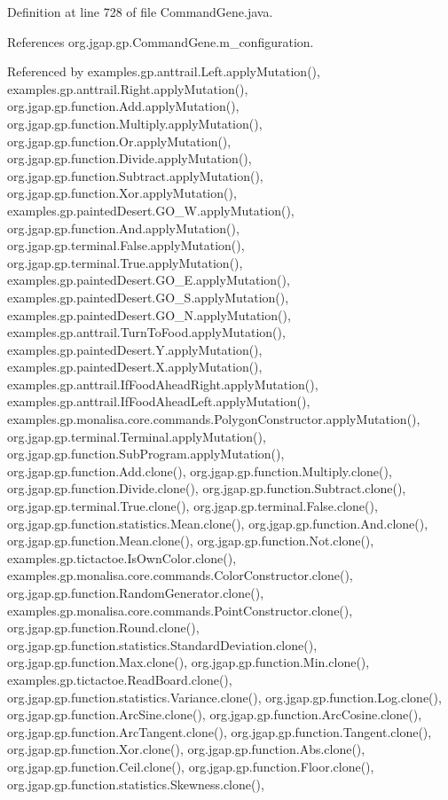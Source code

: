Definition at line 728 of file Command\-Gene.\-java.



References org.\-jgap.\-gp.\-Command\-Gene.\-m\-\_\-configuration.



Referenced by examples.\-gp.\-anttrail.\-Left.\-apply\-Mutation(), examples.\-gp.\-anttrail.\-Right.\-apply\-Mutation(), org.\-jgap.\-gp.\-function.\-Add.\-apply\-Mutation(), org.\-jgap.\-gp.\-function.\-Multiply.\-apply\-Mutation(), org.\-jgap.\-gp.\-function.\-Or.\-apply\-Mutation(), org.\-jgap.\-gp.\-function.\-Divide.\-apply\-Mutation(), org.\-jgap.\-gp.\-function.\-Subtract.\-apply\-Mutation(), org.\-jgap.\-gp.\-function.\-Xor.\-apply\-Mutation(), examples.\-gp.\-painted\-Desert.\-G\-O\-\_\-\-W.\-apply\-Mutation(), org.\-jgap.\-gp.\-function.\-And.\-apply\-Mutation(), org.\-jgap.\-gp.\-terminal.\-False.\-apply\-Mutation(), org.\-jgap.\-gp.\-terminal.\-True.\-apply\-Mutation(), examples.\-gp.\-painted\-Desert.\-G\-O\-\_\-\-E.\-apply\-Mutation(), examples.\-gp.\-painted\-Desert.\-G\-O\-\_\-\-S.\-apply\-Mutation(), examples.\-gp.\-painted\-Desert.\-G\-O\-\_\-\-N.\-apply\-Mutation(), examples.\-gp.\-anttrail.\-Turn\-To\-Food.\-apply\-Mutation(), examples.\-gp.\-painted\-Desert.\-Y.\-apply\-Mutation(), examples.\-gp.\-painted\-Desert.\-X.\-apply\-Mutation(), examples.\-gp.\-anttrail.\-If\-Food\-Ahead\-Right.\-apply\-Mutation(), examples.\-gp.\-anttrail.\-If\-Food\-Ahead\-Left.\-apply\-Mutation(), examples.\-gp.\-monalisa.\-core.\-commands.\-Polygon\-Constructor.\-apply\-Mutation(), org.\-jgap.\-gp.\-terminal.\-Terminal.\-apply\-Mutation(), org.\-jgap.\-gp.\-function.\-Sub\-Program.\-apply\-Mutation(), org.\-jgap.\-gp.\-function.\-Add.\-clone(), org.\-jgap.\-gp.\-function.\-Multiply.\-clone(), org.\-jgap.\-gp.\-function.\-Divide.\-clone(), org.\-jgap.\-gp.\-function.\-Subtract.\-clone(), org.\-jgap.\-gp.\-terminal.\-True.\-clone(), org.\-jgap.\-gp.\-terminal.\-False.\-clone(), org.\-jgap.\-gp.\-function.\-statistics.\-Mean.\-clone(), org.\-jgap.\-gp.\-function.\-And.\-clone(), org.\-jgap.\-gp.\-function.\-Mean.\-clone(), org.\-jgap.\-gp.\-function.\-Not.\-clone(), examples.\-gp.\-tictactoe.\-Is\-Own\-Color.\-clone(), examples.\-gp.\-monalisa.\-core.\-commands.\-Color\-Constructor.\-clone(), org.\-jgap.\-gp.\-function.\-Random\-Generator.\-clone(), examples.\-gp.\-monalisa.\-core.\-commands.\-Point\-Constructor.\-clone(), org.\-jgap.\-gp.\-function.\-Round.\-clone(), org.\-jgap.\-gp.\-function.\-statistics.\-Standard\-Deviation.\-clone(), org.\-jgap.\-gp.\-function.\-Max.\-clone(), org.\-jgap.\-gp.\-function.\-Min.\-clone(), examples.\-gp.\-tictactoe.\-Read\-Board.\-clone(), org.\-jgap.\-gp.\-function.\-statistics.\-Variance.\-clone(), org.\-jgap.\-gp.\-function.\-Log.\-clone(), org.\-jgap.\-gp.\-function.\-Arc\-Sine.\-clone(), org.\-jgap.\-gp.\-function.\-Arc\-Cosine.\-clone(), org.\-jgap.\-gp.\-function.\-Arc\-Tangent.\-clone(), org.\-jgap.\-gp.\-function.\-Tangent.\-clone(), org.\-jgap.\-gp.\-function.\-Xor.\-clone(), org.\-jgap.\-gp.\-function.\-Abs.\-clone(), org.\-jgap.\-gp.\-function.\-Ceil.\-clone(), org.\-jgap.\-gp.\-function.\-Floor.\-clone(), org.\-jgap.\-gp.\-function.\-statistics.\-Skewness.\-clone(), 